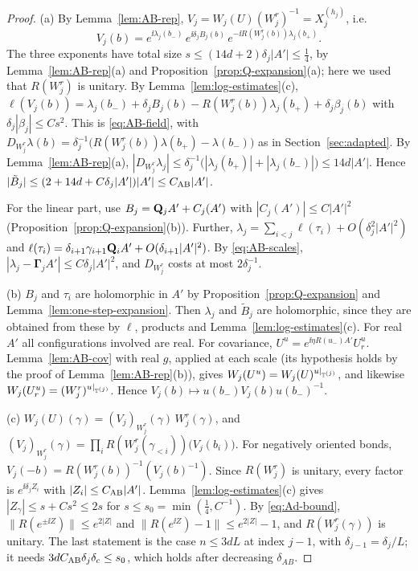 \begin{proof}
(a) By Lemma~\ref{lem:AB-rep}, $V_j=W_j(U)(W^r_j)^{-1}=X_j^{(h_j)}$, i.e.
\[
V_j(b)=e^{\ii\lambda_j(b_-)}\,e^{\ii\delta_jB_j(b)}\,e^{-\ii R(W^r_j(b))\lambda_j(b_+)} .
\]
The three exponents have total size $s\le(14d+2)\delta_j|A'|\le\frac14$, by Lemma~\ref{lem:AB-rep}(a) and Proposition~\ref{prop:Q-expansion}(a); here we used that $R(W^r_j)$ is unitary. By Lemma~\ref{lem:log-estimates}(c), $\ell(V_j(b))=\lambda_j(b_-)+\delta_jB_j(b)-R(W^r_j(b))\lambda_j(b_+)+\delta_j\beta_j(b)$ with $\delta_j|\beta_j|\le Cs^2$. This is \eqref{eq:AB-field}, with $D_{W^r_j}\lambda(b)=\delta_j^{-1}\big(R(W^r_j(b))\lambda(b_+)-\lambda(b_-)\big)$ as in Section~\ref{sec:adapted}. By Lemma~\ref{lem:AB-rep}(a), $|D_{W^r_j}\lambda_j|\le\delta_j^{-1}\big(|\lambda_j(b_+)|+|\lambda_j(b_-)|\big)\le14d|A'|$. Hence $|\tilde B_j|\le(2+14d+C\delta_j|A'|)|A'|\le C_{\rm AB}|A'|$.

For the linear part, use $B_j=\mathbf Q_jA'+C_j(A')$ with $|C_j(A')|\le C|A'|^2$ (Proposition~\ref{prop:Q-expansion}(b)). Further, $\lambda_j=\sum_{i<j}\ell(\tau_i)+O(\delta_j^2|A'|^2)$ and $\ell(\tau_i)=\delta_{i+1}\gamma_{i+1}\mathbf Q_iA'+O(\delta_{i+1}|A'|^2)$. By \eqref{eq:AB-scales}, $|\lambda_j-\boldsymbol\Gamma_jA'|\le C\delta_j|A'|^2$, and $D_{W^r_j}$ costs at most $2\delta_j^{-1}$.

(b) $B_j$ and $\tau_i$ are holomorphic in $A'$ by Proposition~\ref{prop:Q-expansion} and Lemma~\ref{lem:one-step-expansion}. Then $\lambda_j$ and $\tilde B_j$ are holomorphic, since they are obtained from these by $\ell$, products and Lemma~\ref{lem:log-estimates}(c). For real $A'$ all configurations involved are real. For covariance, $U^u=e^{\ii\eta R(u_-)A'}U_r^u$. Lemma~\ref{lem:AB-cov} with real $g$, applied at each scale (its hypothesis holds by the proof of Lemma~\ref{lem:AB-rep}(b)), gives $W_j(U^u)=W_j(U)^{u|_{\mathbb T^{(j)}}}$, and likewise $W_j(U_r^u)=(W^r_j)^{u|_{\mathbb T^{(j)}}}$. Hence $V_j(b)\mapsto u(b_-)V_j(b)u(b_-)^{-1}$.

(c) $W_j(U)(\gamma)=(V_j)_{W^r_j}(\gamma)\,W^r_j(\gamma)$, and $(V_j)_{W^r_j}(\gamma)=\prod_iR(W^r_j(\gamma_{<i}))\big(V_j(b_i)\big)$. For negatively oriented bonds, $V_j(-b)=R(W^r_j(b))^{-1}(V_j(b)^{-1})$. Since $R(W^r_j)$ is unitary, every factor is $e^{\ii\delta_jZ_i}$ with $|Z_i|\le C_{\rm AB}|A'|$. Lemma~\ref{lem:log-estimates}(c) gives $|Z_\gamma|\le s+Cs^2\le2s$ for $s\le s_0=\min(\frac14,C^{-1})$. By \eqref{eq:Ad-bound}, $\|R(e^{\pm\ii Z})\|\le e^{2|Z|}$ and $\|R(e^{\ii Z})-1\|\le e^{2|Z|}-1$, and $R(W^r_j(\gamma))$ is unitary. The last statement is the case $n\le3dL$ at index $j-1$, with $\delta_{j-1}=\delta_j/L$; it needs $3dC_{\rm AB}\delta_j\delta_c\le s_0$, which holds after decreasing $\delta_{AB}$.


\end{proof}
